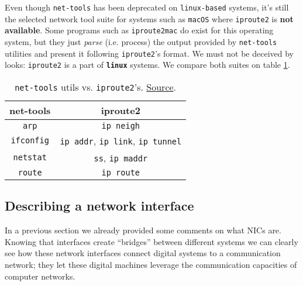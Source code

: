             Even though \texttt{net-tools} has been deprecated on \texttt{linux-based} systems, it's still the selected network tool suite for systems such as \texttt{macOS} where \texttt{iproute2} is \textbf{not available}. Some programs such as \texttt{iproute2mac} do exist for this operating system, but they just \textit{parse} (i.e. process) the output provided by \texttt{net-tools} utilities and present it following \texttt{iproute2}'s format. We must not be deceived by looks: \texttt{iproute2} is a part of \textbf{\texttt{linux}} systems. We compare both suites on table \ref{tab:net-tools-vs-iproute2}.\\

            \begin{table}
                \centering
                \begin{tabular}{|c|c|}
                    \hline
                    \textbf{net-tools} & \textbf{iproute2}\\
                    \hline
                    \texttt{arp} & \texttt{ip neigh}\\
                    \hline
                    \texttt{ifconfig} & \texttt{ip addr}, \texttt{ip link}, \texttt{ip tunnel}\\
                    \hline
                    \texttt{netstat} & \texttt{ss}, \texttt{ip maddr}\\
                    \hline
                    \texttt{route} & \texttt{ip route}\\
                    \hline
                \end{tabular}
                \caption{\texttt{net-tools} utils vs. \texttt{iproute2}'s. \href{https://www.thegeekdiary.com/comparing-net-tools-v-s-iproute-package-commands/}{Source}.}
                \label{tab:net-tools-vs-iproute2}
            \end{table}

        \subsection{Describing a network interface}
            In a previous section we already provided some comments on what NICs are. Knowing that interfaces create ``bridges'' between different systems we can clearly see how these network interfaces connect digital systems to a communication network; they let these digital machines leverage the communication capacities of computer networks.\\

